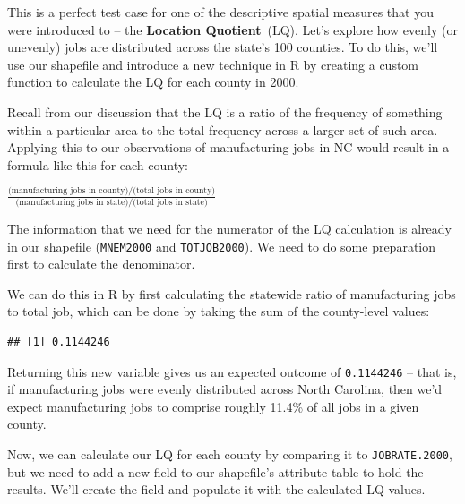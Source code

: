 \documentclass[
]{article}
\newenvironment{Shaded}{\begin{snugshade}}{\end{snugshade}}
\newcommand{\FloatTok}[1]{\textcolor[rgb]{0.00,0.00,0.81}{#1}}
\newcommand{\FunctionTok}[1]{\textcolor[rgb]{0.00,0.00,0.00}{#1}}
\newcommand{\NormalTok}[1]{#1}
\newcommand{\OtherTok}[1]{\textcolor[rgb]{0.56,0.35,0.01}{#1}}
\newcommand{\SpecialCharTok}[1]{\textcolor[rgb]{0.00,0.00,0.00}{#1}}
\begin{document}
This is a perfect test case for one of the descriptive spatial measures
that you were introduced to -- the \textbf{Location Quotient}~(LQ).
Let's explore how evenly (or unevenly) jobs are distributed across the
state's 100 counties. To do this, we'll use our shapefile and introduce
a new technique in R by creating a custom function to calculate the LQ
for each county in 2000.

Recall from our discussion that the LQ is a ratio of the frequency of
something within a particular area to the total frequency across a
larger set of such area. Applying this to our observations of
manufacturing jobs in NC would result in a formula like this for each
county:

\(\frac{\text{(manufacturing jobs in county)/(total jobs in county)}}{\text{(manufacturing jobs in state)/(total jobs in state)}}\)

The information that we need for the numerator of the LQ calculation is
already in our shapefile (\texttt{MNEM2000} and \texttt{TOTJOB2000}). We
need to do some preparation first to calculate the denominator.

We can do this in R by first calculating the statewide ratio of
manufacturing jobs to total job, which can be done by taking the sum of
the county-level values:

\begin{Shaded}
\end{Shaded}

\begin{verbatim}
## [1] 0.1144246
\end{verbatim}

Returning this new variable gives us an expected outcome of
\texttt{0.1144246} -- that is, if manufacturing jobs were evenly
distributed across North Carolina, then we'd expect manufacturing jobs
to comprise roughly 11.4\% of all jobs in a given county.

Now, we can calculate our LQ for each county by comparing it to
\texttt{JOBRATE.2000}, but we need to add a new field to our shapefile's
attribute table to hold the results. We'll create the field and populate
it with the calculated LQ values.
\end{document}
